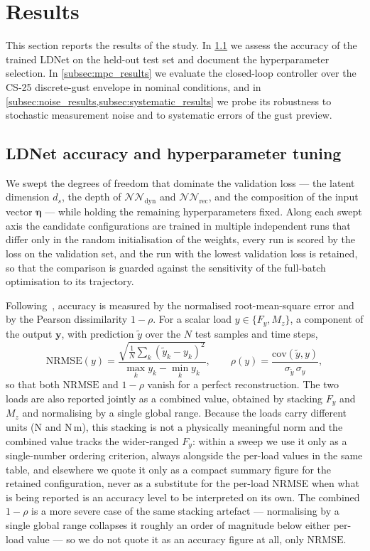 \section{Results}
\label{sec:results}

This section reports the results of the study. In \cref{subsec:training_results} we assess the accuracy of the trained LDNet on the held-out test set and document the hyperparameter selection. In \cref{subsec:mpc_results} we evaluate the closed-loop controller over the CS-25 discrete-gust envelope in nominal conditions, and in \cref{subsec:noise_results,subsec:systematic_results} we probe its robustness to stochastic measurement noise and to systematic errors of the gust preview.

\subsection{LDNet accuracy and hyperparameter tuning}
\label{subsec:training_results}

We swept the degrees of freedom that dominate the validation loss --- the latent dimension $d_s$, the depth of $\mathcal{NN}_\mathrm{dyn}$ and $\mathcal{NN}_\mathrm{rec}$, and the composition of the input vector $\boldsymbol{\eta}$ --- while holding the remaining hyperparameters fixed. Along each swept axis the candidate configurations are trained in multiple independent runs that differ only in the random initialisation of the weights, every run is scored by the loss on the validation set, and the run with the lowest validation loss is retained, so that the comparison is guarded against the sensitivity of the full-batch optimisation to its trajectory.

Following~\cite{Regazzoni}, accuracy is measured by the normalised root-mean-square error and by the Pearson dissimilarity $1-\rho$. For a scalar load $y \in \{F_y, M_z\}$, a component of the output $\mathbf{y}$, with prediction $\tilde{y}$ over the $N$ test samples and time steps,
\begin{equation}
\mathrm{NRMSE}(y) =
\frac{
\sqrt{\frac{1}{N}\sum_k \left(\tilde{y}_k - y_k\right)^2}
}{
\max_k y_k - \min_k y_k
},
\qquad
\rho(y) =
\frac{
\mathrm{cov}(\tilde{y}, y)
}{
\sigma_{\tilde{y}}\, \sigma_y
},
\label{eq:acc_metrics}
\end{equation}
so that both $\mathrm{NRMSE}$ and $1-\rho$ vanish for a perfect reconstruction. The two loads are also reported jointly as a combined value, obtained by stacking $F_y$ and $M_z$ and normalising by a single global range. Because the loads carry different units (N and N\,m), this stacking is not a physically meaningful norm and the combined value tracks the wider-ranged $F_y$: within a sweep we use it only as a single-number ordering criterion, always alongside the per-load values in the same table, and elsewhere we quote it only as a compact summary figure for the retained configuration, never as a substitute for the per-load NRMSE when what is being reported is an accuracy level to be interpreted on its own. The combined $1-\rho$ is a more severe case of the same stacking artefact --- normalising by a single global range collapses it roughly an order of magnitude below either per-load value --- so we do not quote it as an accuracy figure at all, only $\mathrm{NRMSE}$.

